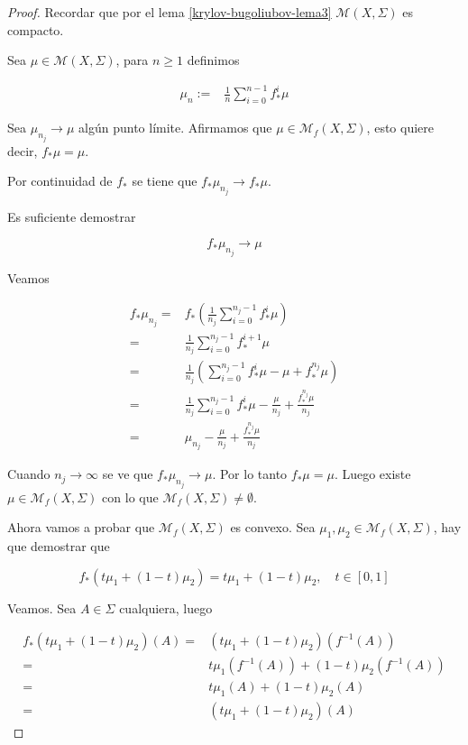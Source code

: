\begin{proof}
	Recordar que por el lema \ref{krylov-bugoliubov-lema3} $\mathcal{M}(X,\Sigma)$ es compacto.
	
	Sea $\mu \in \mathcal{M}(X,\Sigma)$, para $n \geq 1$ definimos
	
	\begin{align}
		\mu_n :=& \frac{1}{n} \sum_{i=0}^{n-1} f_*^i \mu
	\end{align}
	
		Sea $\mu_{n_j} \rightarrow \mu$ algún punto límite. Afirmamos que $\mu \in \mathcal{M}_f(X,\Sigma)$, esto quiere decir, $f_*\mu = \mu$.
	
	Por continuidad de $f_*$ se tiene que $f_*\mu_{n_j} \rightarrow f_*\mu$.
	
	Es suficiente demostrar
	
	\begin{equation}
	f_*\mu_{n_j} \rightarrow \mu
	\end{equation}
	
	Veamos
	
	\begin{align}
	f_*\mu_{n_j} =& f_* \left( \frac{1}{n_j} \sum_{i=0}^{n_j-1} f^i_* \mu \right)\\
	=& \frac{1}{n_j} \sum_{i=0}^{n_j-1} f_*^{i+1} \mu\\
	=& \frac{1}{n_j} \left( \sum_{i=0}^{n_j-1} f^i_* \mu - \mu + f^{n_j}_* \mu \right)\\
	=& \frac{1}{n_j} \sum_{i=0}^{n_j-1} f^i_* \mu - \frac{\mu}{n_j} + \frac{f^{n_j}_* \mu}{n_j}\\
	=& \mu_{n_j} - \frac{\mu}{n_j} + \frac{f^{n_j}_* \mu}{n_j}
	\end{align}
	
	Cuando $n_j \rightarrow \infty$ se ve que $f_* \mu_{n_j} \rightarrow \mu$. Por lo tanto $f_*\mu=\mu$. Luego existe $\mu \in \mathcal{M}_f(X,\Sigma)$ con lo que $\mathcal{M}_f(X,\Sigma) \neq \emptyset$.
	
	Ahora vamos a probar que $\mathcal{M}_f(X,\Sigma)$ es convexo. Sea $\mu_1,\mu_2 \in \mathcal{M}_f(X,\Sigma)$, hay que demostrar que
	
	\begin{equation}
	f_*(t\mu_1 + (1-t)\mu_2) = t\mu_1 + (1-t)\mu_2, \quad t \in [0,1]
	\end{equation}
	
	Veamos. Sea $A \in \Sigma$ cualquiera, luego 
	
	\begin{align}
	f_*(t\mu_1 + (1-t)\mu_2)(A) =& (t\mu_1 + (1-t)\mu_2)(f^{-1}(A))\\
	=& t\mu_1(f^{-1}(A)) + (1-t)\mu_2(f^{-1}(A))\\
	=& t\mu_1(A) + (1-t)\mu_2(A)\\
	=& (t\mu_1 + (1-t)\mu_2)(A)
	\end{align}
	

\end{proof}
